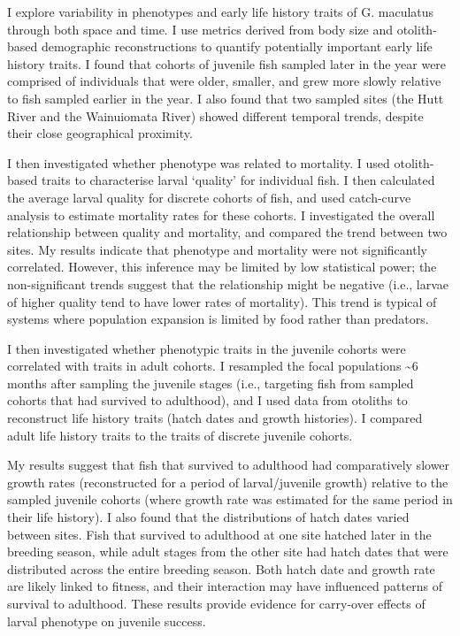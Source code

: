 \documentclass[]{book}
\begin{document}
I explore variability in phenotypes and early life history traits of G.
maculatus through both space and time. I use metrics derived from body
size and otolith-based demographic reconstructions to quantify
potentially important early life history traits. I found that cohorts of
juvenile fish sampled later in the year were comprised of individuals
that were older, smaller, and grew more slowly relative to fish sampled
earlier in the year. I also found that two sampled sites (the Hutt River
and the Wainuiomata River) showed different temporal trends, despite
their close geographical proximity.

I then investigated whether phenotype was related to mortality. I used
otolith-based traits to characterise larval `quality' for individual
fish. I then calculated the average larval quality for discrete cohorts
of fish, and used catch-curve analysis to estimate mortality rates for
these cohorts. I investigated the overall relationship between quality
and mortality, and compared the trend between two sites. My results
indicate that phenotype and mortality were not significantly correlated.
However, this inference may be limited by low statistical power; the
non-significant trends suggest that the relationship might be negative
(i.e., larvae of higher quality tend to have lower rates of mortality).
This trend is typical of systems where population expansion is limited
by food rather than predators.

I then investigated whether phenotypic traits in the juvenile cohorts
were correlated with traits in adult cohorts. I resampled the focal
populations \textasciitilde{}6 months after sampling the juvenile stages
(i.e., targeting fish from sampled cohorts that had survived to
adulthood), and I used data from otoliths to reconstruct life history
traits (hatch dates and growth histories). I compared adult life history
traits to the traits of discrete juvenile cohorts.

My results suggest that fish that survived to adulthood had
comparatively slower growth rates (reconstructed for a period of
larval/juvenile growth) relative to the sampled juvenile cohorts (where
growth rate was estimated for the same period in their life history). I
also found that the distributions of hatch dates varied between sites.
Fish that survived to adulthood at one site hatched later in the
breeding season, while adult stages from the other site had hatch dates
that were distributed across the entire breeding season. Both hatch date
and growth rate are likely linked to fitness, and their interaction may
have influenced patterns of survival to adulthood. These results provide
evidence for carry-over effects of larval phenotype on juvenile success.
\end{document}
